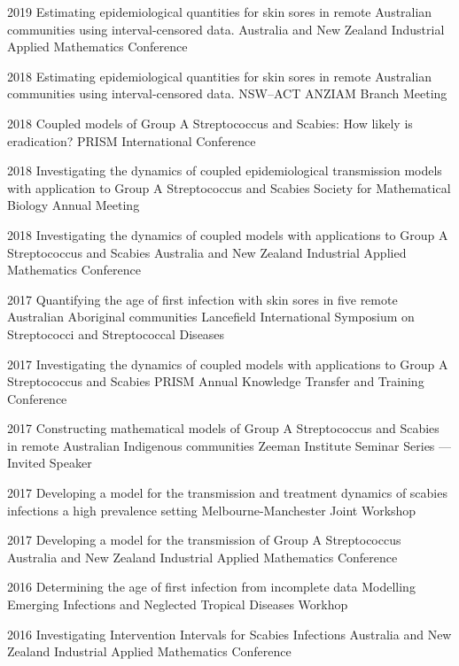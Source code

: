 \documentclass[9pt]{developercv} %
\begin{document}
\begin{entrylist}
    \talk
        {2019}
        {Estimating epidemiological quantities for skin sores in remote Australian communities using interval-censored data.}
        {Australia and New Zealand Industrial Applied Mathematics Conference}
        
    \talk
        {2018}
        {Estimating epidemiological quantities for skin sores in remote Australian communities using interval-censored data.}
        {NSW--ACT ANZIAM Branch Meeting}
        
    \talk
        {2018}
        {Coupled models of Group A Streptococcus and Scabies: How likely is eradication?}
        {PRISM International Conference}
        
    \talk
        {2018}
        {Investigating the dynamics of coupled epidemiological transmission models with application to Group A Streptococcus and Scabies}
        {Society for Mathematical Biology Annual Meeting}
        
    \talk
        {2018}
        {Investigating the dynamics of coupled models with applications to Group A Streptococcus and Scabies}
        {Australia and New Zealand Industrial Applied Mathematics Conference}
        
    \talk
        {2017}
        {Quantifying the age of first infection with skin sores in five remote Australian Aboriginal communities}
        {Lancefield International Symposium on Streptococci and Streptococcal Diseases}
        
    \talk
        {2017}
        {Investigating the dynamics of coupled models with applications to Group A Streptococcus and Scabies}
        {PRISM Annual Knowledge Transfer and Training Conference}
        
    \talk
        {2017}
        {Constructing mathematical models of Group A Streptococcus and Scabies in remote Australian Indigenous communities}
        {Zeeman Institute Seminar Series --- Invited Speaker}
        
    \talk
        {2017}
        {Developing a model for the transmission and treatment dynamics of scabies infections a high prevalence setting}
        {Melbourne-Manchester Joint Workshop}
        
    \talk
        {2017}
        {Developing a model for the transmission of Group A Streptococcus}
        {Australia and New Zealand Industrial Applied Mathematics Conference}

    \talk
        {2016}
        {Determining the age of first infection from incomplete data}
        {Modelling Emerging Infections and Neglected Tropical Diseases Workhop}

    \talk
        {2016}
        {Investigating Intervention Intervals for Scabies Infections}
        {Australia and New Zealand Industrial Applied Mathematics Conference}
\end{entrylist}
\end{document}
